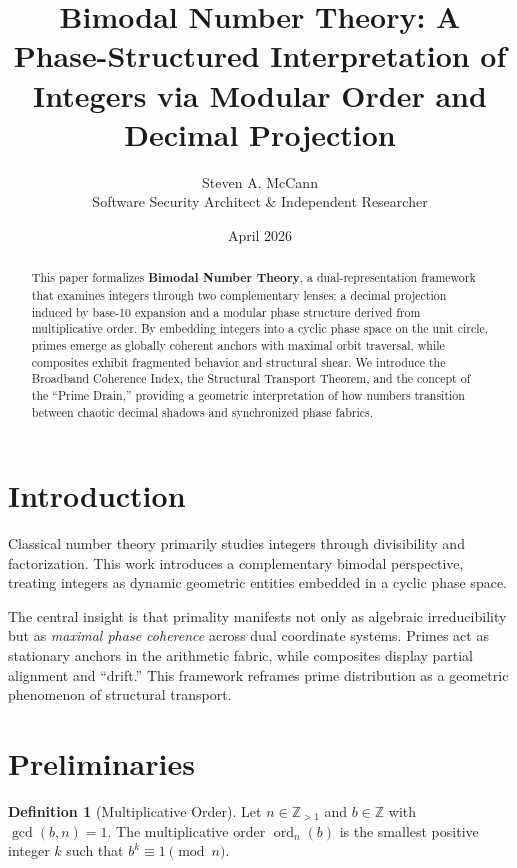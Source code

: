 \documentclass[11pt,a4paper]{article}
\title{\textbf{Bimodal Number Theory: A Phase-Structured Interpretation of Integers via Modular Order and Decimal Projection}}
\author{Steven A. McCann \\ \small{Software Security Architect \& Independent Researcher}}
\date{April 2026}
\theoremstyle{definition}
\newtheorem{definition}{Definition}[section]
\begin{document}
\maketitle

\begin{abstract}
This paper formalizes \textbf{Bimodal Number Theory}, a dual-representation framework that examines integers through two complementary lenses: a decimal projection induced by base-10 expansion and a modular phase structure derived from multiplicative order. By embedding integers into a cyclic phase space on the unit circle, primes emerge as globally coherent anchors with maximal orbit traversal, while composites exhibit fragmented behavior and structural shear. We introduce the Broadband Coherence Index, the Structural Transport Theorem, and the concept of the ``Prime Drain,'' providing a geometric interpretation of how numbers transition between chaotic decimal shadows and synchronized phase fabrics.
\end{abstract}

\tableofcontents
\newpage

\section{Introduction}

Classical number theory primarily studies integers through divisibility and factorization. This work introduces a complementary bimodal perspective, treating integers as dynamic geometric entities embedded in a cyclic phase space. 

The central insight is that primality manifests not only as algebraic irreducibility but as \emph{maximal phase coherence} across dual coordinate systems. Primes act as stationary anchors in the arithmetic fabric, while composites display partial alignment and ``drift.'' This framework reframes prime distribution as a geometric phenomenon of structural transport.

\section{Preliminaries}

\begin{definition}[Multiplicative Order]
Let \( n \in \mathbb{Z}_{>1} \) and \( b \in \mathbb{Z} \) with \( \gcd(b,n)=1 \). The multiplicative order \( \operatorname{ord}_n(b) \) is the smallest positive integer \( k \) such that \( b^k \equiv 1 \pmod{n} \).
\end{definition}
\end{document}
